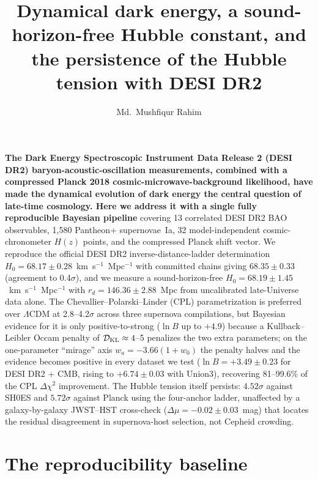 \documentclass[11pt]{article}
\title{\textbf{Dynamical dark energy, a sound-horizon-free Hubble constant, and the persistence of the Hubble tension with DESI DR2}}
\author{Md.~Mushfiqur Rahim}
\date{}
\begin{document}
\maketitle

\textbf{The Dark Energy Spectroscopic Instrument Data Release 2 (DESI DR2) baryon-acoustic-oscillation measurements, combined with a compressed Planck 2018 cosmic-microwave-background likelihood, have made the dynamical evolution of dark energy the central question of late-time cosmology. Here we address it with a single fully reproducible Bayesian pipeline} covering 13 correlated DESI DR2 BAO observables, 1{,}580 Pantheon+ supernovae~Ia, 32 model-independent cosmic-chronometer $H(z)$ points, and the compressed Planck shift vector. We reproduce the official DESI DR2 inverse-distance-ladder determination $H_0 = 68.17 \pm 0.28$~km~s$^{-1}$~Mpc$^{-1}$ with committed chains giving $68.35 \pm 0.33$ (agreement to 0.4$\sigma$), and we measure a sound-horizon-free $H_0 = 68.19 \pm 1.45$~km~s$^{-1}$~Mpc$^{-1}$ with $r_d = 146.36 \pm 2.88$~Mpc from uncalibrated late-Universe data alone. The Chevallier--Polarski--Linder (CPL) parametrization is preferred over $\Lambda$CDM at 2.8--4.2$\sigma$ across three supernova compilations, but Bayesian evidence for it is only positive-to-strong ($\ln B$ up to $+4.9$) because a Kullback--Leibler Occam penalty of $\mathcal{D}_{\rm KL} \approx 4$--5 penalizes the two extra parameters; on the one-parameter ``mirage'' axis $w_a = -3.66(1+w_0)$ the penalty halves and the evidence becomes positive in every dataset we test ($\ln B = +3.49 \pm 0.23$ for DESI DR2 + CMB, rising to $+6.74 \pm 0.03$ with Union3), recovering 81--99.6\% of the CPL $\Delta\chi^2$ improvement. The Hubble tension itself persists: $4.52\sigma$ against SH0ES and $5.72\sigma$ against Planck using the four-anchor ladder, unaffected by a galaxy-by-galaxy JWST--HST cross-check ($\Delta\mu = -0.02 \pm 0.03$~mag) that locates the residual disagreement in supernova-host selection, not Cepheid crowding.

\section*{The reproducibility baseline}
\end{document}
